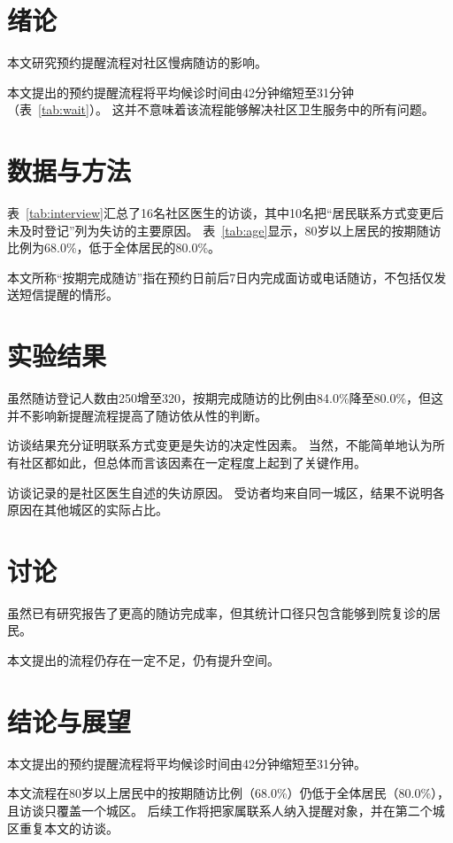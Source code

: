 \documentclass{ctexart}
\begin{document}
\chapter{绪论}
本文研究预约提醒流程对社区慢病随访的影响。

本文提出的预约提醒流程将平均候诊时间由42分钟缩短至31分钟（表~\ref{tab:wait}）。
这并不意味着该流程能够解决社区卫生服务中的所有问题。

\chapter{数据与方法}
表~\ref{tab:interview}汇总了16名社区医生的访谈，其中10名把“居民联系方式变更后未及时登记”列为失访的主要原因。
表~\ref{tab:age}显示，80岁以上居民的按期随访比例为68.0\%，低于全体居民的80.0\%。

本文所称“按期完成随访”指在预约日前后7日内完成面访或电话随访，不包括仅发送短信提醒的情形。

\chapter{实验结果}
虽然随访登记人数由250增至320，按期完成随访的比例由84.0\%降至80.0\%，但这并不影响新提醒流程提高了随访依从性的判断。

访谈结果充分证明联系方式变更是失访的决定性因素。
当然，不能简单地认为所有社区都如此，但总体而言该因素在一定程度上起到了关键作用。

访谈记录的是社区医生自述的失访原因。
受访者均来自同一城区，结果不说明各原因在其他城区的实际占比。

\chapter{讨论}
虽然已有研究\cite{followup2020}报告了更高的随访完成率，但其统计口径只包含能够到院复诊的居民。

本文提出的流程仍存在一定不足，仍有提升空间。

\chapter{结论与展望}
本文提出的预约提醒流程将平均候诊时间由42分钟缩短至31分钟。

本文流程在80岁以上居民中的按期随访比例（68.0\%）仍低于全体居民（80.0\%），且访谈只覆盖一个城区。
后续工作将把家属联系人纳入提醒对象，并在第二个城区重复本文的访谈。
\end{document}
